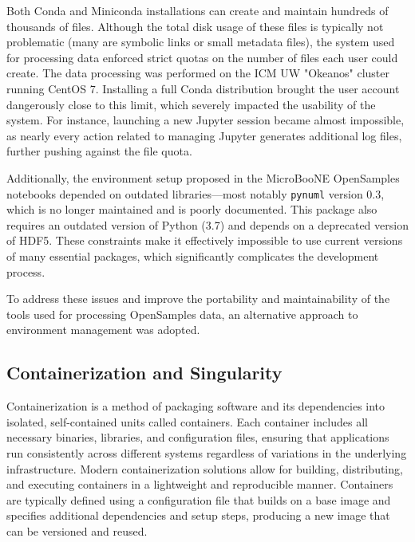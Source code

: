 \documentclass{pracalicmgr}
\begin{document}
Both Conda and Miniconda installations can create and maintain hundreds of thousands of files. Although the total disk usage of these files is typically not problematic (many are symbolic links or small metadata files), the system used for processing data enforced strict quotas on the number of files each user could create. The data processing was performed on the ICM UW "Okeanos" cluster running CentOS 7. Installing a full Conda distribution brought the user account dangerously close to this limit, which severely impacted the usability of the system. For instance, launching a new Jupyter session became almost impossible, as nearly every action related to managing Jupyter generates additional log files, further pushing against the file quota.

Additionally, the environment setup proposed in the MicroBooNE OpenSamples notebooks depended on outdated libraries—most notably \texttt{pynuml} version 0.3, which is no longer maintained and is poorly documented. This package also requires an outdated version of Python (3.7) and depends on a deprecated version of HDF5. These constraints make it effectively impossible to use current versions of many essential packages, which significantly complicates the development process.

To address these issues and improve the portability and maintainability of the tools used for processing OpenSamples data, an alternative approach to environment management was adopted.

\subsection{Containerization and Singularity}

Containerization is a method of packaging software and its dependencies into isolated, self-contained units called containers. Each container includes all necessary binaries, libraries, and configuration files, ensuring that applications run consistently across different systems regardless of variations in the underlying infrastructure. Modern containerization solutions allow for building, distributing, and executing containers in a lightweight and reproducible manner. Containers are typically defined using a configuration file that builds on a base image and specifies additional dependencies and setup steps, producing a new image that can be versioned and reused.
\end{document}
